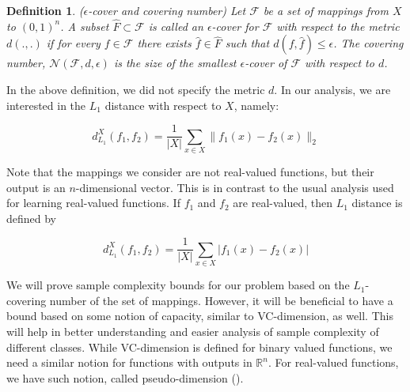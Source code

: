 \documentclass[letterpaper,12pt,titlepage,oneside,final]{book}
\newtheorem{definition}{Definition}
\begin{document}
\begin{definition} {($\epsilon$-cover and covering number)} Let $\mathcal{F}$ be a set of mappings from $X$ to $(0,1)^{n}$. A subset $\hat{F}\subset \mathcal{F}$ is called an $\epsilon$-cover for $\mathcal{F}$ with respect to the metric $d(.,.)$ if for every $f\in \mathcal{F}$ there exists $\hat{f}\in \hat{F}$ such that $d(f, \hat{f}) \leq \epsilon$. The covering number, $\mathcal{N}(\mathcal{F}, d, \epsilon)$ is the size of the smallest $\epsilon$-cover of $\mathcal{F}$ with respect to $d$. 

\end{definition}

In the above definition, we did not specify the metric $d$. In our analysis, we are interested in the $L_1$ distance with respect to $X$, namely:





\begin{equation}
d_{L_1}^{X} (f_1, f_2) = \frac{1}{|X|}\sum_{x\in X} \|f_1(x) - f_2(x)\|_2
\end{equation}

Note that the mappings we consider are not real-valued functions, but their output is an $n$-dimensional vector. This is in contrast to the usual analysis used for learning real-valued functions. If $f_1$ and $f_2$ are real-valued, then $L_1$ distance is defined by

\begin{equation}
d_{L_1}^{X} (f_1, f_2) = \frac{1}{|X|}\sum_{x\in X} |f_1(x) - f_2(x)|
\end{equation}


We will prove sample complexity bounds for our problem based on the $L_1$-covering number of the set of mappings. However, it will be beneficial to have a bound based on some notion of capacity, similar to VC-dimension, as well. This will help in better understanding and easier analysis of sample complexity of different classes. While VC-dimension is defined for binary valued functions, we need a similar notion for functions with outputs in $\mathbb{R}^n$. For real-valued functions, we have such notion, called pseudo-dimension (\cite{pollard1984convergence}).
\end{document}
